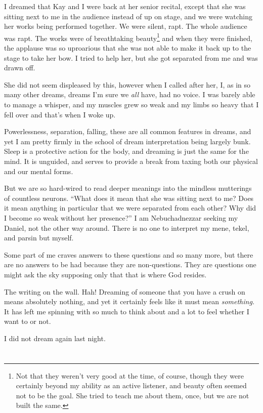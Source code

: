 I dreamed that Kay and I were back at her senior recital, except that she was sitting next to me in the audience instead of up on stage, and we were watching her works being performed together. We were silent, rapt. The whole audience was rapt. The works were of breathtaking beauty\footnote{Not that they weren't very good at the time, of course, though they were certainly beyond my ability as an active listener, and beauty often seemed not to be the goal. She tried to teach me about them, once, but we are not built the same.} and when they were finished, the applause was so uproarious that she was not able to make it back up to the stage to take her bow. I tried to help her, but she got separated from me and was drawn off.

She did not seem displeased by this, however when I called after her, I, as in so many other dreams, dreams I'm sure we \emph{all} have, had no voice. I was barely able to manage a whisper, and my muscles grew so weak and my limbs so heavy that I fell over and that's when I woke up.

Powerlessness, separation, falling, these are all common features in dreams, and yet I am pretty firmly in the school of dream interpretation being largely bunk. Sleep is a protective action for the body, and dreaming is just the same for the mind. It is unguided, and serves to provide a break from taxing both our physical and our mental forms.

But we are so hard-wired to read deeper meanings into the mindless mutterings of countless neurons. ``What does it mean that she was sitting next to me? Does it mean anything in particular that we were separated from each other? Why did I become so weak without her presence?'' I am Nebuchadnezzar seeking my Daniel, not the other way around. There is no one to interpret my mene, tekel, and parsin but myself.

Some part of me craves answers to these questions and so many more, but there are no answers to be had because they are non-questions. They are questions one might ask the sky supposing only that that is where God resides.

The writing on the wall. Hah! Dreaming of someone that you have a crush on means absolutely nothing, and yet it certainly feels like it must mean \emph{something.} It has left me spinning with so much to think about and a lot to feel whether I want to or not.

I did not dream again last night.

\section{}

